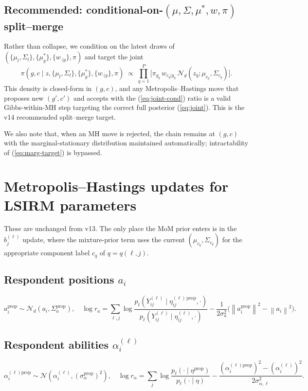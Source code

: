 \documentclass[11pt]{article}
\newcommand{\norm}[1]{\left\lVert #1 \right\rVert}
\begin{document}
\subsection{Recommended: conditional-on-$(\mu,\Sigma,\mu^*,w,\pi)$ split--merge}
\label{sec:condSM}

Rather than collapse, we condition on the latest draws of
$(\{\mu_l,\Sigma_l\},\{\mu_g^*\},\{w_{\cdot|g}\},\pi)$ and target the joint
\begin{equation}
\pi(g,c \mid z,\{\mu_l,\Sigma_l\},\{\mu_g^*\},\{w_{\cdot|g}\},\pi)
 \;\propto\;
\prod_{q=1}^{P}\bigl[\pi_{g_q}\,w_{c_q|g_q}\,
   \mathcal{N}_d(z_q;\mu_{c_q},\Sigma_{c_q})\bigr].
\label{eq:joint-cond}
\end{equation}
This density is closed-form in $(g,c)$, and any Metropolis--Hastings move
that proposes new $(g',c')$ and accepts with the (\ref{eq:joint-cond})
ratio is a valid Gibbs-within-MH step targeting the correct full posterior
(\ref{eq:joint}). This is the v14 recommended split--merge target.

We also note that, when an MH move is rejected, the chain remains at
$(g,c)$ with the marginal-stationary distribution maintained automatically;
intractability of (\ref{eq:marg-target}) is bypassed.

\section{Metropolis--Hastings updates for LSIRM parameters}
\label{sec:mh}

These are unchanged from v13. The only place the MoM prior enters is in
the $b_j^{(\ell)}$ update, where the mixture-prior term uses the current
$(\mu_{c_q},\Sigma_{c_q})$ for the appropriate component label $c_q$ of
$q=q(\ell,j)$.

\subsection{Respondent positions $a_i$}
\begin{equation}
a_i^{\mathrm{prop}} \sim \mathcal{N}_d(a_i,\Sigma_a^{\mathrm{prop}}),
\quad
\log r_a = \sum_{\ell,j}\log
   \frac{p_\ell(Y_{ij}^{(\ell)}\mid\eta_{ij}^{(\ell)\,\mathrm{prop}},\cdot)}
        {p_\ell(Y_{ij}^{(\ell)}\mid\eta_{ij}^{(\ell)},\cdot)}
   - \frac{1}{2\sigma_a^2}\bigl(\norm{a_i^{\mathrm{prop}}}^2-\norm{a_i}^2\bigr).
\label{eq:a-mh}
\end{equation}

\subsection{Respondent abilities $\alpha_i^{(\ell)}$}
\begin{equation}
\alpha_i^{(\ell)\mathrm{prop}}\sim\mathcal{N}(\alpha_i^{(\ell)},(\sigma_\alpha^{\mathrm{prop}})^2),
\quad
\log r_\alpha = \sum_j\log\frac{p_\ell(\cdot\mid\eta^{\mathrm{prop}})}{p_\ell(\cdot\mid\eta)}
   - \frac{(\alpha_i^{(\ell)\mathrm{prop}})^2 - (\alpha_i^{(\ell)})^2}{2\sigma_{\alpha,\ell}^2}.
\label{eq:alpha-mh}
\end{equation}
\end{document}
